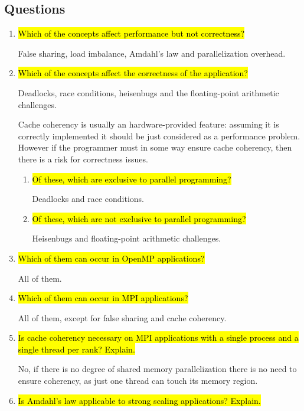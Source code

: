 \documentclass{article}
\begin{document}
\subsection{Questions}
\begin{enumerate}
	\item \hl{Which of the concepts affect performance but not correctness?}

	False sharing, load imbalance, Amdahl's law and parallelization overhead.

	\item \hl{Which of the concepts affect the correctness of the application?}

	Deadlocks, race conditions, heisenbugs and the floating-point arithmetic challenges.

	Cache coherency is usually an hardware-provided feature: assuming it is correctly implemented it should be just considered as a performance problem. However if the programmer must in some way ensure cache coherency, then there is a risk for correctness issues.

	\begin{enumerate}[label=\Alph*]
		\item \hl{Of these, which are exclusive to parallel programming?}

		Deadlocks and race conditions.

		\item \hl{Of these, which are not exclusive to parallel programming?}

		Heisenbugs and floating-point arithmetic challenges.

	\end{enumerate}

	\item \hl{Which of them can occur in OpenMP applications?}

	All of them.
	
	\item \hl{Which of them can occur in MPI applications?}

	All of them, except for false sharing and cache coherency.
	
	\item \hl{Is cache coherency necessary on MPI applications with a single process and a single thread per rank? Explain.}

	No, if there is no degree of shared memory parallelization there is no need to ensure coherency, as just one thread can touch its memory region.
	
	\item \hl{Is Amdahl's law applicable to strong scaling applications? Explain.}


\end{enumerate}
\end{document}

